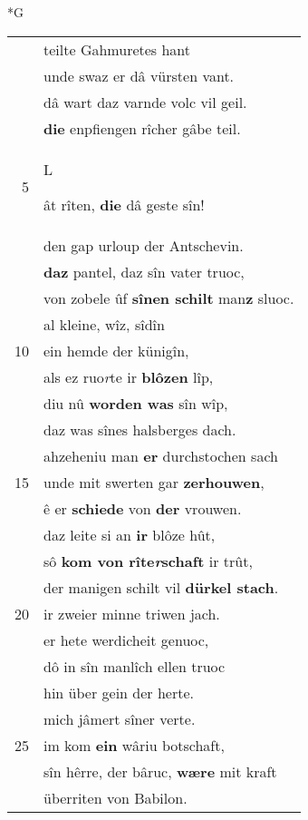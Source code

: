 \documentclass[8pt,a4paper,notitlepage]{article}
\begin{document}
\newpage
\begin{table}[ht]
\begin{minipage}[t]{0.5\linewidth}
\small
\begin{center}*G
\end{center}
\begin{tabular}{rl}
 & teilte Gahmuretes hant\\ 
 & unde swaz er dâ vürsten vant.\\ 
 & dâ wart daz varnde volc vil geil.\\ 
 & \textbf{die} enpfiengen rîcher gâbe teil.\\ 
5 & \begin{large}L\end{large}ât rîten, \textbf{die} dâ geste sîn!\\ 
 & den gap urloup der Antschevin.\\ 
 & \textbf{daz} pantel, daz sîn vater truoc,\\ 
 & von zobele ûf \textbf{sînen schilt} man\textbf{z} sluoc.\\ 
 & al kleine, wîz, sîdîn\\ 
10 & ein hemde der künigîn,\\ 
 & als ez ruo\textit{r}te ir \textbf{blôzen} lîp,\\ 
 & diu nû \textbf{worden was} sîn wîp,\\ 
 & daz was sînes halsberges dach.\\ 
 & ahzeheniu man \textbf{er} durchstochen sach\\ 
15 & unde mit swerten gar \textbf{zerhouwen},\\ 
 & ê er \textbf{schiede} von \textbf{der} vrouwen.\\ 
 & daz leite si an \textbf{ir} blôze hût,\\ 
 & sô \textbf{kom von rîte\textit{r}schaft} ir trût,\\ 
 & der manigen schilt vil \textbf{dürkel stach}.\\ 
20 & ir zweier minne triwen jach.\\ 
 & er hete werdicheit genuoc,\\ 
 & dô in sîn manlîch ellen truoc\\ 
 & hin über gein der herte.\\ 
 & mich jâmert sîner verte.\\ 
25 & im kom \textbf{ein} wâriu botschaft,\\ 
 & sîn hêrre, der bâruc, \textbf{wære} mit kraft\\ 
 & überriten von Babilon.\\ 

\end{tabular}
\end{minipage}
\end{table}
\end{document}
